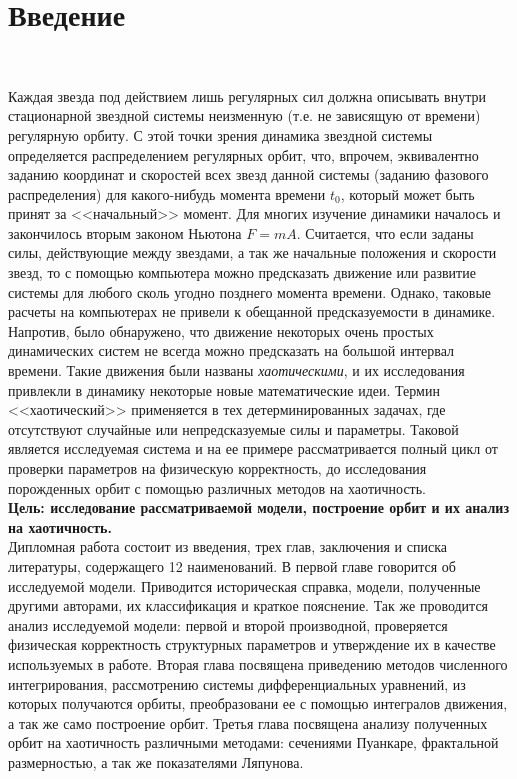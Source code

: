 \section*{Введение}
~\par
Каждая звезда под действием лишь регулярных сил должна описывать внутри стационарной звездной системы неизменную (т.е. не зависящую от времени) регулярную орбиту. С этой точки зрения динамика звездной системы определяется распределением регулярных орбит, что, впрочем, эквивалентно заданию координат и скоростей всех звезд данной системы (заданию фазового распределения) для какого-нибудь момента времени $t_0$, который может быть принят за <<начальный>> момент. Для многих изучение динамики началось и закончилось вторым законом Ньютона $F=mA$. Считается, что если заданы силы, действующие между звездами, а так же начальные положения и скорости звезд, то с помощью компьютера можно предсказать движение или развитие системы для любого сколь угодно позднего момента времени. Однако, таковые расчеты на компьютерах не привели к обещанной предсказуемости в динамике. Напротив, было обнаружено, что движение некоторых очень простых динамических систем не всегда можно предсказать на большой интервал времени. Такие движения были названы \textit{хаотическими}, и их исследования привлекли в динамику некоторые новые математические идеи. Термин <<хаотический>> применяется в тех детерминированных задачах, где отсутствуют случайные или непредсказуемые силы и параметры. Таковой является исследуемая система и на ее примере рассматривается полный цикл от проверки параметров на физическую корректность, до исследования порожденных орбит с помощью различных методов на хаотичность.\\

{\large\textbf{Цель: исследование рассматриваемой модели, построение орбит и их анализ на хаотичность.}}\\

Дипломная работа состоит из введения, трех глав, заключения и списка литературы, содержащего 12 наименований. В первой главе говорится об исследуемой модели. Приводится историческая справка, модели, полученные другими авторами, их классификация и краткое пояснение. Так же проводится анализ исследуемой модели: первой и второй производной, проверяется физическая корректность структурных параметров и утверждение их в качестве используемых в работе. Вторая глава посвящена приведению методов численного интегрирования, рассмотрению системы дифференциальных уравнений, из которых получаются орбиты, преобразовани ее с помощью интегралов движения, а так же само построение орбит. Третья глава посвящена анализу полученных орбит на хаотичность различными методами: сечениями Пуанкаре, фрактальной размерностью, а так же показателями Ляпунова.